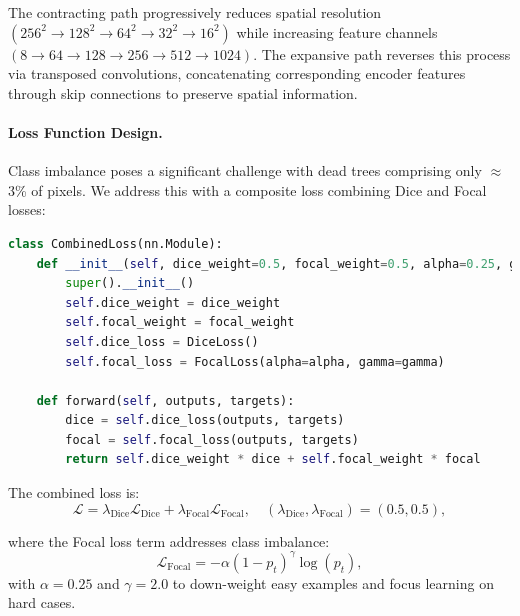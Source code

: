 The contracting path progressively reduces spatial resolution \((256^2 \rightarrow 128^2 \rightarrow 64^2 \rightarrow 32^2 \rightarrow 16^2)\) while increasing feature channels \((8 \rightarrow 64 \rightarrow 128 \rightarrow 256 \rightarrow 512 \rightarrow 1024)\). The expansive path reverses this process via transposed convolutions, concatenating corresponding encoder features through skip connections to preserve spatial information.

\paragraph{Loss Function Design.}
Class imbalance poses a significant challenge with dead trees comprising only $\approx$3\% of pixels. We address this with a composite loss combining Dice and Focal losses:

\begin{lstlisting}[language=Python]
class CombinedLoss(nn.Module):
    def __init__(self, dice_weight=0.5, focal_weight=0.5, alpha=0.25, gamma=2.0):
        super().__init__()
        self.dice_weight = dice_weight
        self.focal_weight = focal_weight
        self.dice_loss = DiceLoss()
        self.focal_loss = FocalLoss(alpha=alpha, gamma=gamma)
        
    def forward(self, outputs, targets):
        dice = self.dice_loss(outputs, targets)
        focal = self.focal_loss(outputs, targets)
        return self.dice_weight * dice + self.focal_weight * focal
\end{lstlisting}

The combined loss is:
\begin{equation}
  \mathcal{L} = \lambda_{\text{Dice}}\mathcal{L}_{\text{Dice}} + \lambda_{\text{Focal}}\mathcal{L}_{\text{Focal}},
  \quad (\lambda_{\text{Dice}}, \lambda_{\text{Focal}}) = (0.5, 0.5),
\end{equation}

where the Focal loss term addresses class imbalance:
\begin{equation}
\mathcal{L}_{\text{Focal}} = -\alpha(1-p_t)^\gamma \log(p_t),
\end{equation}
with $\alpha = 0.25$ and $\gamma = 2.0$ to down-weight easy examples and focus learning on hard cases.

